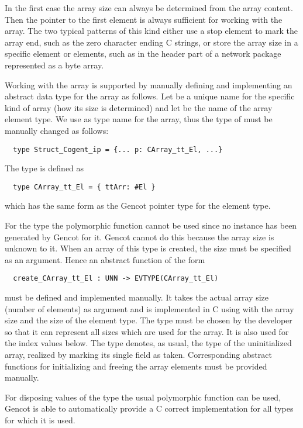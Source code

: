 In the first case the array size can always be determined from the array content. Then the pointer to the first 
element is always sufficient for working with the array. The two typical patterns of this kind either use a 
stop element to mark the array end, such as the zero character ending C strings, or store the array size in a
specific element or elements, such as in the header part of a network package represented as a byte array.

Working with the array is supported by manually defining and implementing an abstract data type for the array as follows.
Let  be a unique name for the specific kind of array (how its size is determined) and let  be the
name of the array element type. We use  as type name for the array, thus the 
type of  must be manually changed as follows:
\begin{verbatim}
  type Struct_Cogent_ip = {... p: CArray_tt_El, ...}
\end{verbatim}

The type  is defined as
\begin{verbatim}
  type CArray_tt_El = { ttArr: #El }
\end{verbatim}
which has the same form as the Gencot pointer type for the element type.

For the type  the polymorphic function  cannot be used since no instance has been
generated by Gencot for it. Gencot cannot do this because the array size is unknown to it. When an array 
of this type is created, the size must be specified as an argument. Hence an abstract function of the form
\begin{verbatim}
  create_CArray_tt_El : UNN -> EVTYPE(CArray_tt_El)
\end{verbatim}
must be defined and implemented manually. It takes the actual array size (number of elements) as argument and is
implemented in C using  with the array size and the size of the element type. The type  must be
chosen by the developer so that it can represent all sizes which are used for the array. It is also used for the index
values below. The type  denotes, as usual, the type of the uninitialized array, realized
by marking its single field  as taken. Corresponding abstract functions 
for initializing and freeing the array elements must be provided manually.

For disposing values of the type  the usual polymorphic function  can be used, 
Gencot is able to automatically provide a C correct implementation for all types for which it is used.

